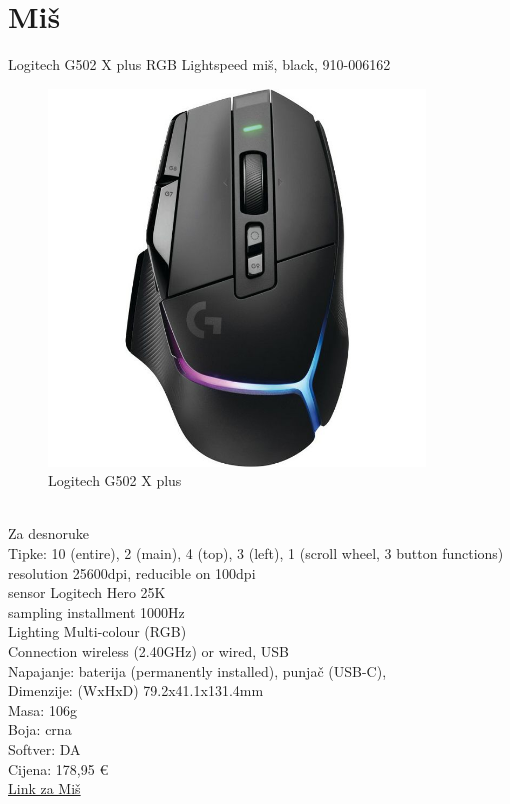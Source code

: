 \documentclass{article}
\begin{document}
\section{Miš}
Logitech G502 X plus RGB Lightspeed miš, black, 910-006162
\begin{figure}[h]
    \includegraphics[width=10cm]{miš.jpg}
    \caption{Logitech G502 X plus}
\end{figure}\\
Za desnoruke\\
Tipke: 10 (entire), 2 (main), 4 (top), 3 (left), 1 (scroll wheel, 3 button functions)
resolution 25600dpi, reducible on 100dpi\\
sensor Logitech Hero 25K\\
sampling installment 1000Hz\\
Lighting Multi-colour (RGB)\\
Connection wireless (2.40GHz) or wired, USB\\
Napajanje: baterija (permanently installed), punjač (USB-C), \\
Dimenzije: (WxHxD) 79.2x41.1x131.4mm\\
Masa: 106g\\
Boja: crna\\
Softver: DA\\
Cijena: 178,95 €\\
\href{https://www.adm.hr/logitech-g502-x-plus-rgb-lightspeed-mis-black-910-006162/75978/product/}{Link za Miš}
\newpage
\end{document}
